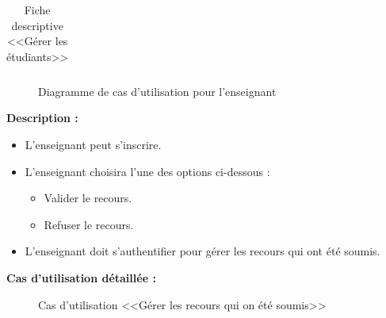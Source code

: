 \documentclass[12pt]{report}
\begin{document}
\begin{table}[h]
\begin{tabular}{|c|l|}
\end{tabular}
    \caption{Fiche descriptive <<Gérer les étudiants>>}
\end{table}

\begin{figure}[H]
\centering
  \vspace{-0.1in}
    \centerline{}
    \caption{Diagramme de cas d'utilisation pour l'enseignant}
  \vspace*{-0.3in}
\end{figure}

\newpage

\vspace{0.1in}

\textbf{Description :}

\begin{itemize}
    \item L'enseignant peut s'inscrire.
    \item L'enseignant choisira l'une des options ci-dessous :
    \begin{itemize}
        \item Valider le recours.
        \item Refuser le recours.
    \end{itemize}
    \item L'enseignant doit s'authentifier pour gérer les recours qui ont été soumis.
\end{itemize}

\vspace{0.2in}

\textbf{Cas d'utilisation détaillée :}

\begin{figure}[h]
\centering
    \centerline{}
    \caption{Cas d'utilisation <<Gérer les recours qui on été soumis>>}
\end{figure}
\end{document}
